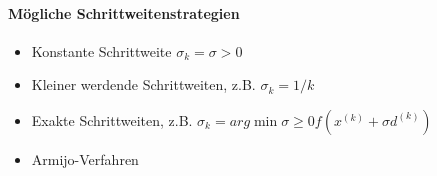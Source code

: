\paragraph{Mögliche Schrittweitenstrategien}

\begin{itemize}
	\item Konstante Schrittweite $\sigma_k = \sigma > 0$
	\item Kleiner werdende Schrittweiten, z.B. $\sigma_k = 1/k$
	\item Exakte Schrittweiten, z.B. $\sigma_k = arg \min {\sigma \geq 0} f(x^{(k)} + \sigma d^{(k)})$
	\item  Armijo-Verfahren
\end{itemize}




